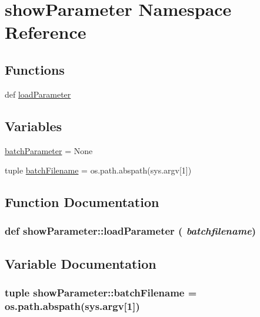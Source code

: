 \hypertarget{namespaceshowParameter}{
\section{showParameter Namespace Reference}
\label{namespaceshowParameter}
}


\subsection*{Functions}
\begin{CompactItemize}
\item 
def \hyperlink{namespaceshowParameter_ff57745dfb1cffa90529e3c8f95b687b}{loadParameter}
\end{CompactItemize}
\subsection*{Variables}
\begin{CompactItemize}
\item 
\hyperlink{namespaceshowParameter_94c3490ede27cef67c541f6bca29ec6d}{batchParameter} = None
\item 
tuple \hyperlink{namespaceshowParameter_aa770a043cdc58412758e0c155fc6311}{batchFilename} = os.path.abspath(sys.argv\mbox{[}1\mbox{]})
\end{CompactItemize}


\subsection{Function Documentation}
\hypertarget{namespaceshowParameter_ff57745dfb1cffa90529e3c8f95b687b}{
\subsubsection{\setlength{\rightskip}{0pt plus 5cm}def showParameter::loadParameter ( {\em batchfilename})}}
\label{namespaceshowParameter_ff57745dfb1cffa90529e3c8f95b687b}




\subsection{Variable Documentation}
\hypertarget{namespaceshowParameter_aa770a043cdc58412758e0c155fc6311}{
\subsubsection{\setlength{\rightskip}{0pt plus 5cm}tuple {\bf showParameter::batchFilename} = os.path.abspath(sys.argv\mbox{[}1\mbox{]})}}
\label{namespaceshowParameter_aa770a043cdc58412758e0c155fc6311}


